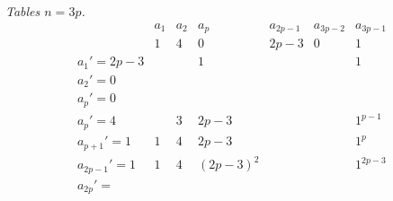 \documentclass[11pt]{article}
\begin{document}
\noindent\textit{Tables $n=3p$.}
\[
\begin{array}{l|cccccc}
              & a_{1}    & a_{2}    & a_{p}    & a_{2p-1}    & a_{3p-2}    & a_{3p-1}\\
              & 1        & 4        & 0        & 2p-3        & 0           & 1\\
\hline
a_{1}'=2p-3   &          &          & 1        &             &             & 1\\
a_{2}'=0      &          &          &          &             &             & \\
a_{p}'=0      &          &          &          &             &             & \\
a_{p}'=4      &          & 3        & 2p-3     &             &             & 1^{p-1}\\
a_{p+1}'=1    & 1        & 4        & 2p-3     &             &             & 1^{p}\\
a_{2p-1}'=1   & 1        & 4        & (2p-3)^{2}&            &             & 1^{2p-3}\\
a_{2p}'=      &          &          &          &             &             &
\end{array}
\]


\bigskip
\end{document}
